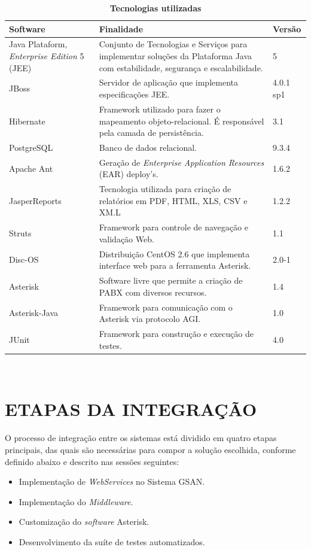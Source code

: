 \begin{table}[H]
	\footnotesize
	\caption{\textbf{Tecnologias utilizadas}}
	\label{tabela:tecnologiasUtilizadas}
	\begin{tabular}{|p{4cm}|p{7cm}|p{2cm}|}
		\hline
		\textbf{Software} & \textbf{Finalidade} & \textbf{Versão} \\
		\hline
		Java Plataform, \textit{Enterprise Edition} 5 (JEE) & Conjunto de Tecnologias e Serviços para implementar soluções da Plataforma Java com estabilidade, segurança e escalabilidade. & 5 \\
		\hline
		JBoss 				& Servidor de aplicação que implementa especificações JEE. 								& 4.0.1 sp1 \\
		\hline
		Hibernate 			& Framework utilizado para fazer o mapeamento objeto-relacional. É responsável pela camada de persistência. & 3.1 \\
		\hline
		PostgreSQL 			& Banco de dados relacional. 															& 9.3.4 \\
		\hline
		Apache Ant 			& Geração de \textit{Enterprise Application Resources} (EAR) deploy’s. 					& 1.6.2 \\
		\hline
		JasperReports 		& Tecnologia utilizada para criação de relatórios em PDF, HTML, XLS, CSV e XM.L 		& 1.2.2 \\
		\hline
		Struts 				& Framework para controle de navegação e validação Web. 								& 1.1	 \\
		\hline
		Disc-OS 			& Distribuição CentOS 2.6 que implementa interface web para a ferramenta Asterisk. 		& 2.0-1 \\
		\hline
		Asterisk 			& Software livre que permite a criação de PABX com diversos recursos. 					& 1.4 \\		
		\hline
		Asterisk-Java 		& Framework para comunicação com o Asterisk via protocolo AGI. 							& 1.0 \\
		\hline
		JUnit		 		& Framework para construção e execução de testes. 										& 4.0 \\		
		\hline			
	\end{tabular}\\[6pt]
	\fontsize{10}{12}\selectfont {Fonte: Autoria Própria.}
\end{table}



\section{\uppercase{Etapas da Integração}}
O processo de integração entre os sistemas está dividido em quatro etapas principais, das quais são necessárias para compor a solução escolhida, conforme definido abaixo e descrito nas sessões seguintes:

\begin{itemize}
	\item Implementação de \textit{WebServices} no Sistema GSAN. 
	\item Implementação do \textit{Middleware}.
	\item Customização do \textit{software} Asterisk.
	\item Desenvolvimento da suíte de testes automatizados.
\end{itemize}

